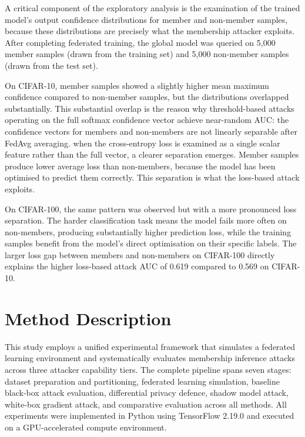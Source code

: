 \documentclass[12pt, a4paper]{report}
\begin{document}
A critical component of the exploratory analysis is the examination of the trained
model's output confidence distributions for member and non-member samples, because
these distributions are precisely what the membership attacker exploits. After
completing federated training, the global model was queried on 5,000 member samples
(drawn from the training set) and 5,000 non-member samples (drawn from the test
set).

On CIFAR-10, member samples showed a slightly higher mean maximum confidence
compared to non-member samples, but the distributions overlapped substantially.
This substantial overlap is the reason why threshold-based attacks operating on the
full softmax confidence vector achieve near-random AUC: the confidence vectors for
members and non-members are not linearly separable after FedAvg averaging.
when the cross-entropy loss is examined as a single scalar feature rather than the
full vector, a clearer separation emerges. Member samples produce lower average loss
than non-members, because the model has been optimised to predict them correctly.
This separation is what the loss-based attack exploits.

On CIFAR-100, the same pattern was observed but with a more pronounced loss
separation. The harder classification task means the model fails more often on
non-members, producing substantially higher prediction loss, while the training
samples benefit from the model's direct optimisation on their specific labels.
The larger loss gap between members and non-members on CIFAR-100 directly explains
the higher loss-based attack AUC of 0.619 compared to 0.569 on CIFAR-10.

\chapter{Method Description}

This study employs a unified experimental framework that simulates a federated
learning environment and systematically evaluates membership inference attacks
across three attacker capability tiers. The complete pipeline spans seven stages:
dataset preparation and partitioning, federated learning simulation, baseline
black-box attack evaluation, differential privacy defence, shadow model attack,
white-box gradient attack, and comparative evaluation across all methods. All
experiments were implemented in Python using TensorFlow 2.19.0 and executed on
a GPU-accelerated compute environment.
\end{document}
